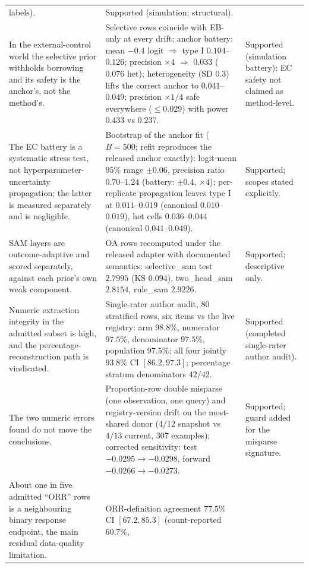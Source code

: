 \documentclass[11pt]{article}
\begin{document}
\begin{longtable}{p{} p{} p{}}
labels). & Supported (simulation; structural). \\
In the external-control world the selective prior withholds borrowing and
its safety is the anchor's, not the method's. & Selective rows coincide with
EB-only at every drift; anchor battery: mean $-0.4$ logit $\Rightarrow$
type I $0.104$--$0.126$; precision $\times4$ $\Rightarrow$ $0.033$
($0.076$ het); heterogeneity (SD $0.3$) lifts the correct anchor to
$0.041$--$0.049$; precision $\times1/4$ safe everywhere ($\le0.029$) with
power $0.433$ vs $0.237$. & Supported (simulation battery); EC safety not
claimed as method-level. \\
The EC battery is a systematic stress test, not hyperparameter-uncertainty
propagation; the latter is measured separately and is negligible. &
Bootstrap of the anchor fit ($B=500$; refit reproduces the released anchor
exactly): logit-mean $95\%$ range $\pm 0.06$, precision ratio
$0.70$--$1.24$ (battery: $\pm 0.4$, $\times 4$); per-replicate propagation
leaves type I at $0.011$--$0.019$ (canonical $0.010$--$0.019$), het cells
$0.036$--$0.044$ (canonical $0.041$--$0.049$). & Supported; scopes stated
explicitly. \\
SAM layers are outcome-adaptive and scored separately, against each prior's
own weak component. & OA rows recomputed under the released adapter with
documented semantics: selective\_sam test $2.7995$ (KS $0.094$), two\_head\_sam
$2.8154$, rule\_sam $2.9226$. & Supported; descriptive only. \\
Numeric extraction integrity in the admitted subset is high, and the
percentage-reconstruction path is vindicated. & Single-rater author audit, 80 stratified
rows, six items vs the live registry: arm $98.8\%$, numerator $97.5\%$,
denominator $97.5\%$, population $97.5\%$; all four jointly $93.8\%$ CI
$[86.2,97.3]$; percentage stratum denominators $42/42$. & Supported
(completed single-rater author audit). \\
The two numeric errors found do not move the conclusions. & Proportion-row
double misparse (one observation, one query) and registry-version drift on
the most-shared donor ($4/12$ snapshot vs $4/13$ current, 307 examples);
corrected sensitivity: test $-0.0295 \to -0.0298$, forward $-0.0266 \to
-0.0273$. & Supported; guard added for the misparse signature. \\
About one in five admitted ``ORR'' rows is a neighbouring binary response
endpoint, the main residual data-quality limitation. & ORR-definition
agreement $77.5\%$ CI $[67.2,85.3]$ (count-reported $60.7\%$,

\end{longtable}
\end{document}
